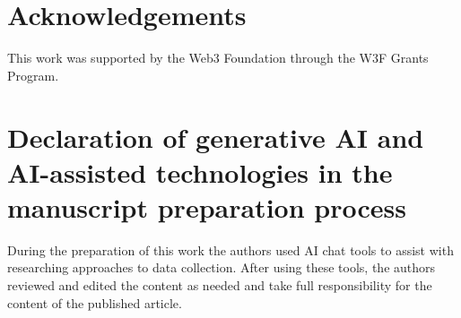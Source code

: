 \documentclass[5p,times,twocolumn,final]{elsarticle}
\newif\ifanonymous
\begin{document}
\ifanonymous\else
\section*{Acknowledgements}
This work was supported by the Web3 Foundation through the W3F Grants Program.
\fi

\section*{Declaration of generative AI and AI-assisted technologies in the manuscript preparation process}
During the preparation of this work the authors used AI chat tools to assist with researching approaches to data collection. After using these tools, the authors reviewed and edited the content as needed and take full responsibility for the content of the published article.



\end{document}
